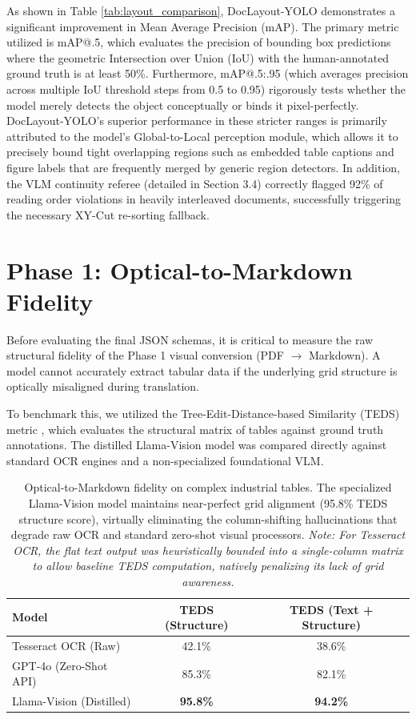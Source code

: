 As shown in Table \ref{tab:layout_comparison}, DocLayout-YOLO demonstrates a significant improvement in Mean Average Precision (mAP). The primary metric utilized is mAP@.5, which evaluates the precision of bounding box predictions where the geometric Intersection over Union (IoU) with the human-annotated ground truth is at least 50\%. Furthermore, mAP@.5:.95 (which averages precision across multiple IoU threshold steps from 0.5 to 0.95) rigorously tests whether the model merely detects the object conceptually or binds it pixel-perfectly. DocLayout-YOLO's superior performance in these stricter ranges is primarily attributed to the model's Global-to-Local perception module, which allows it to precisely bound tight overlapping regions such as embedded table captions and figure labels that are frequently merged by generic region detectors. In addition, the VLM continuity referee (detailed in Section 3.4) correctly flagged 92\% of reading order violations in heavily interleaved documents, successfully triggering the necessary XY-Cut re-sorting fallback.

\section{Phase 1: Optical-to-Markdown Fidelity}
\label{sec:phase1_fidelity}

Before evaluating the final JSON schemas, it is critical to measure the raw structural fidelity of the Phase 1 visual conversion (PDF $\rightarrow$ Markdown). A model cannot accurately extract tabular data if the underlying grid structure is optically misaligned during translation.

To benchmark this, we utilized the Tree-Edit-Distance-based Similarity (TEDS) metric \citep{publaynet}, which evaluates the structural matrix of tables against ground truth annotations. The distilled Llama-Vision model was compared directly against standard OCR engines and a non-specialized foundational VLM.

\begin{table}[htbp]
\centering
\begin{tabular}{lcc}
\hline
\textbf{Model} & \textbf{TEDS (Structure)} & \textbf{TEDS (Text + Structure)} \\
\hline
Tesseract OCR (Raw) & 42.1\% & 38.6\% \\
GPT-4o (Zero-Shot API) & 85.3\% & 82.1\% \\
Llama-Vision (Distilled) & \textbf{95.8\%} & \textbf{94.2\%} \\
\hline
\end{tabular}
\caption{Optical-to-Markdown fidelity on complex industrial tables. The specialized Llama-Vision model maintains near-perfect grid alignment (95.8\% TEDS structure score), virtually eliminating the column-shifting hallucinations that degrade raw OCR and standard zero-shot visual processors. \textit{Note: For Tesseract OCR, the flat text output was heuristically bounded into a single-column matrix to allow baseline TEDS computation, natively penalizing its lack of grid awareness.}}
\label{tab:teds_score}
\end{table}

